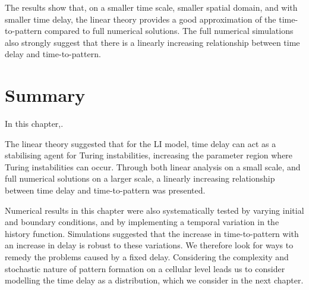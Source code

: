 
The results show that, on a smaller time scale, smaller spatial domain, and with smaller time delay, the linear theory provides a good approximation of the time-to-pattern compared to full numerical solutions. The full numerical simulations also strongly suggest that there is a linearly increasing relationship between time delay and time-to-pattern.
\section{Summary}

In this chapter,.

The linear theory suggested that for the LI model, time delay can act as a stabilising agent for Turing instabilities,  increasing the parameter region where Turing instabilities can occur.  Through both linear analysis on a small scale, and full numerical solutions on a larger scale, a linearly increasing relationship between time delay and time-to-pattern was presented.

Numerical results in this chapter were also systematically tested by varying initial and boundary conditions, and by implementing a temporal variation in the history function. Simulations suggested that the increase in time-to-pattern with an increase in delay is robust to these variations. We therefore look for ways to remedy the problems caused by a fixed delay. Considering the complexity and stochastic nature of pattern formation on a cellular level leads us to consider modelling the time delay as a distribution, which we consider in the next chapter.
